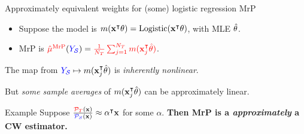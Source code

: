 


\begin{frame}[t]{Approximately equivalent weights for (some) logistic regression MrP}

\def\alphav{\mathbf{\alpha}}
%
\begin{itemize}
    \item Suppose the model is $m(\mathbf{x}^\intercal \theta) = \mathrm{Logistic}(\mathbf{x}^\intercal \theta)$, with MLE $\hat{\theta}$.
    \item MrP is $\textcolor{red}{\hat{\mu}^{\mathrm{MrP}}}(\textcolor{blue}{\textcolor{blue}{Y_{\mathcal{S}}}}) = \textcolor{red}{\frac{1}{{N_T}} \sum_{j=1}^{N_T} m(\mathbf{x}_j^\intercal \hat{\theta})}$.
\end{itemize}

\pause
The map from $\textcolor{blue}{\textcolor{blue}{Y_{\mathcal{S}}}} \mapsto m(\mathbf{x}_j^\intercal \hat{\theta})$ is
\emph{inherently nonlinear}.

But \emph{some sample averages}
of $m(\mathbf{x}_j^\intercal \hat{\theta})$ can be approximately linear.
\pause
%
\begin{block}{Example}
Suppose
    $\frac{\tarcol{\ptar}(\x)}{\surcol{\psur}(\x)} \approx \alphav^\trans \x$ for some $\alpha$.
    \textbf{Then MrP is a \emph{approximately} a CW estimator.}
\end{block}

\end{frame}

